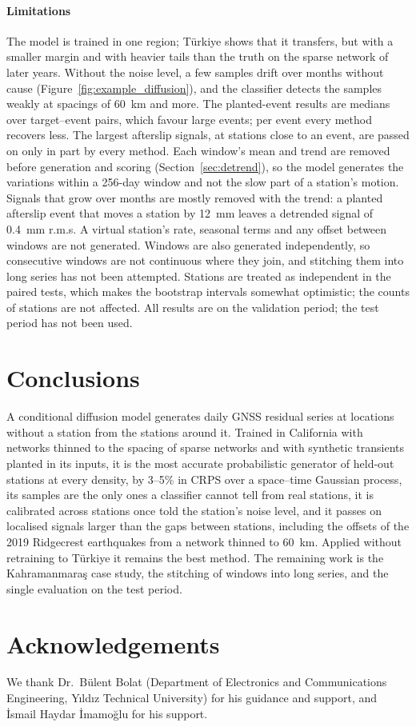 \documentclass[preprint,12pt,authoryear]{elsarticle}
\begin{document}
\paragraph{Limitations} The model is trained in one region; T\"urkiye shows that it
transfers, but with a smaller margin and with heavier tails than the truth on the sparse
network of later years. Without the noise level, a few samples drift over months without
cause (Figure~\ref{fig:example_diffusion}), and the classifier detects the samples weakly
at spacings of 60~km and more. The planted-event results are medians over target--event
pairs, which favour large events; per event every method recovers less. The largest
afterslip signals, at stations close to an event, are passed on only in part by every
method. Each window's mean and trend are removed before generation and scoring
(Section~\ref{sec:detrend}), so the model generates the variations within a 256-day
window and not the slow part of a station's motion. Signals that grow over months are
mostly removed with the trend: a planted afterslip event that moves a station by 12~mm
leaves a detrended signal of 0.4~mm r.m.s. A virtual station's rate, seasonal terms and
any offset between windows are not generated. Windows are also generated independently,
so consecutive windows are not continuous where they join, and stitching them into long
series has not been attempted.
Stations are treated as independent in the paired tests, which makes the bootstrap
intervals somewhat optimistic; the counts of stations are not affected. All results are
on the validation period; the test period has not been used.

\section{Conclusions}
\label{sec:conclusions}

A conditional diffusion model generates daily GNSS residual series at locations without a
station from the stations around it. Trained in California with networks thinned to the
spacing of sparse networks and with synthetic transients planted in its inputs, it is the
most accurate probabilistic generator of held-out stations at every density, by 3--5\% in
CRPS over a space--time Gaussian process, its samples are the only ones a classifier
cannot tell from real stations, it is calibrated across stations once told the station's
noise level, and it passes on localised signals larger than the gaps between stations,
including the offsets of the 2019 Ridgecrest earthquakes from a network thinned to 60~km.
Applied without retraining to T\"urkiye it remains the best method. The remaining work is
the Kahramanmara\c{s} case study, the stitching
of windows into long series, and the single evaluation on the test period.

\section*{Acknowledgements}

We thank Dr.\ Bülent Bolat (Department of Electronics and Communications Engineering,
Yıldız Technical University) for his guidance and support, and İsmail Haydar İmamoğlu for
his support.



\end{document}
